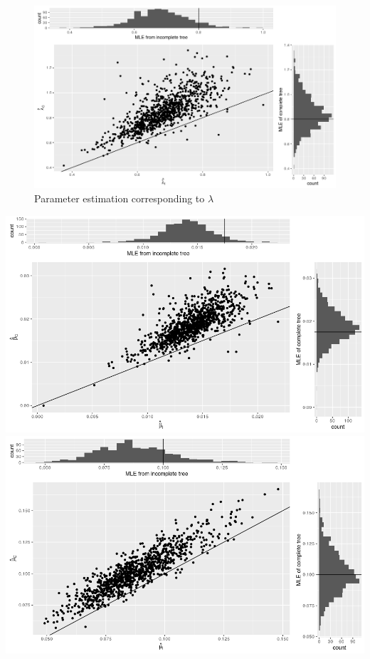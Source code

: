 \documentclass[10pt,a4paper]{article}
\begin{document}
\begin{center}
\begin{figure}
  \includegraphics[scale=0.6]{lambda.png}
  \caption{Parameter estimation corresponding to $\lambda$}
\end{figure}
  \noindent\makebox[\linewidth]{\rule{\paperwidth}{0.4pt}}
  \includegraphics[scale=0.6]{beta.png}
  \noindent\makebox[\linewidth]{\rule{\paperwidth}{0.4pt}}
  \includegraphics[scale=0.6]{mu.png}
  \noindent\makebox[\linewidth]{\rule{\paperwidth}{0.4pt}}
\end{center}
\end{document}

